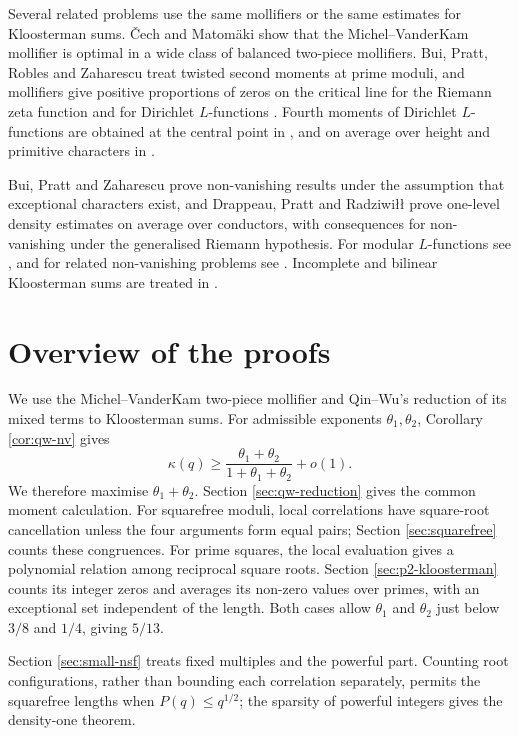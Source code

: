 \documentclass[12pt, a4paper]{amsart}
\numberwithin{equation}{section}
\renewcommand{\le}{\leqslant}
\renewcommand{\ge}{\geqslant}
\theoremstyle{plain}
\begin{document}
Several related problems use the same mollifiers or the same estimates for Kloosterman sums. \v{C}ech and Matom\"aki \cite{CechMatOptimal} show that the Michel--VanderKam mollifier is optimal in a wide class of balanced two-piece mollifiers. Bui, Pratt, Robles and Zaharescu \cite{BPRZ} treat twisted second moments at prime moduli, and mollifiers give positive proportions of zeros on the critical line for the Riemann zeta function \cite{Conrey} and for Dirichlet $L$-functions \cite{WuTwisted}. Fourth moments of Dirichlet $L$-functions are obtained at the central point in \cite{Young,WuCentral}, and on average over height and primitive characters in \cite{WuLine}.

Bui, Pratt and Zaharescu \cite{BPZ} prove non-vanishing results under the assumption that exceptional characters exist, and Drappeau, Pratt and Radziwi\l\l{} \cite{DPR} prove one-level density estimates on average over conductors, with consequences for non-vanishing under the generalised Riemann hypothesis. For modular $L$-functions see \cite{ISAuto,KMV}, and for related non-vanishing problems see \cite{Castillo, David, Diaconu, Sound}. Incomplete and bilinear Kloosterman sums are treated in \cite{FI,KMS,KSWX}.
\section{Overview of the proofs}\label{sec:outline}

 We use the Michel--VanderKam two-piece mollifier and Qin--Wu's reduction of its mixed terms to Kloosterman sums. For admissible exponents $\theta_1,\theta_2$, Corollary \ref{cor:qw-nv} gives
$$
\kappa(q)\ge\frac{\theta_1+\theta_2}{1+\theta_1+\theta_2}+o(1).
$$
 We therefore maximise $\theta_1+\theta_2$. Section \ref{sec:qw-reduction} gives the common moment calculation. For squarefree moduli, local correlations have square-root cancellation unless the four arguments form equal pairs; Section \ref{sec:squarefree} counts these congruences. For prime squares, the local evaluation gives a polynomial relation among reciprocal square roots. Section \ref{sec:p2-kloosterman} counts its integer zeros and averages its non-zero values over primes, with an exceptional set independent of the length. Both cases allow $\theta_1$ and $\theta_2$ just below $3/8$ and $1/4$, giving $5/13$.

Section \ref{sec:small-nsf} treats fixed multiples and the powerful part. Counting root configurations, rather than bounding each correlation separately, permits the squarefree lengths when $P(q)\le q^{1/2}$; the sparsity of powerful integers gives the density-one theorem.
\end{document}
